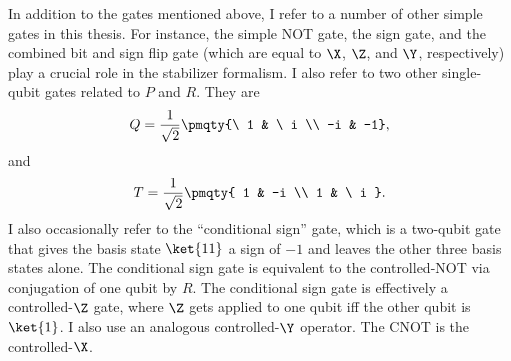In addition to the gates mentioned above, I refer to a number of other simple
gates in this thesis.  For instance, the simple NOT gate, the sign gate, and
the combined bit and sign flip gate (which are equal to $\X$, $\Z$, and $\Y$,
respectively) play a crucial role in the stabilizer formalism.  I also
refer to two other single-qubit gates related to $P$ and $R$.  They are
\begin{equation}
	Q = \frac{1}{\sqrt{2}} \pmqty{\ 1 & \ i \\ -i & -1},
\end{equation}
and
\begin{equation}
	T = \frac{1}{\sqrt{2}} \pmqty{ 1 & -i \\ 1 & \ i }.
\end{equation}
I also occasionally refer to the ``conditional sign'' gate, which is a
two-qubit gate that gives the basis state $\ket{11}$ a sign of $-1$ and
leaves the other three basis states alone.  The conditional sign gate is
equivalent to the controlled-NOT via conjugation of one qubit by $R$.  The
conditional sign gate is effectively a controlled-$\Z$ gate, where $\Z$
gets applied to one qubit iff the other qubit is $\ket{1}$.  I also use
an analogous controlled-$\Y$ operator.  The CNOT is the controlled-$\X$.

